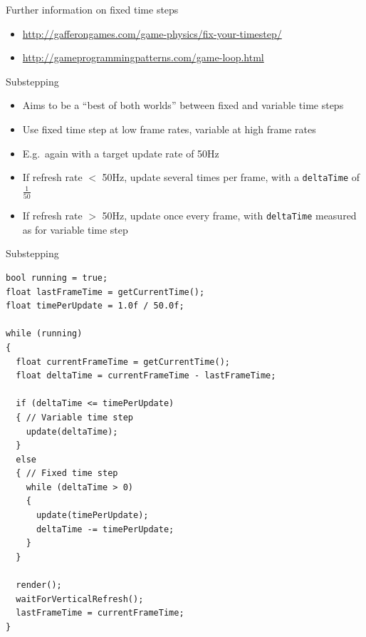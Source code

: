 \begin{frame}{Further information on fixed time steps}
    \begin{itemize}
        \item \url{http://gafferongames.com/game-physics/fix-your-timestep/}
        \item \url{http://gameprogrammingpatterns.com/game-loop.html}
    \end{itemize}
\end{frame}

\begin{frame}{Substepping}
    \begin{itemize}
        \pause\item Aims to be a ``best of both worlds'' between fixed and variable time steps 
        \pause\item Use fixed time step at low frame rates, variable at high frame rates 
        \pause\item E.g.\ again with a target update rate of 50Hz 
        \pause\item If refresh rate $<$ 50Hz, update several times per frame, with a \lstinline{deltaTime} of $\frac{1}{50}$ 
        \pause\item If refresh rate $>$ 50Hz, update once every frame, with \lstinline{deltaTime} measured as for variable time step
    \end{itemize}
\end{frame}

\begin{frame}[fragile]{Substepping}
    \begin{lstlisting}[basicstyle=\tiny\ttfamily]
bool running = true;
float lastFrameTime = getCurrentTime();
float timePerUpdate = 1.0f / 50.0f;

while (running)
{
  float currentFrameTime = getCurrentTime();
  float deltaTime = currentFrameTime - lastFrameTime;

  if (deltaTime <= timePerUpdate)
  { // Variable time step
    update(deltaTime);
  }
  else
  { // Fixed time step
    while (deltaTime > 0)
    {
      update(timePerUpdate);
      deltaTime -= timePerUpdate;
    }
  }
  
  render();
  waitForVerticalRefresh();
  lastFrameTime = currentFrameTime;
}
    \end{lstlisting}
\end{frame}

